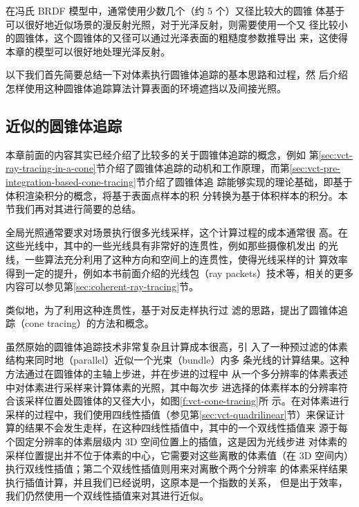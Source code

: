 在冯氏 BRDF 模型中，通常使用少数几个（约 5 个）又径比较大的圆锥 体基于可以很好地近似场景的漫反射光照，对于光泽反射，则需要使用一个又 径比较小的圆锥体，这个圆锥体的又径可以通过光泽表面的粗糙度参数推导出 来，这使得本章的模型可以很好地处理光泽反射。

以下我们首先简要总结一下对体素执行圆锥体追踪的基本思路和过程，然 后介绍怎样使用这种圆锥体追踪算法计算表面的环境遮挡以及间接光照。




\subsection{近似的圆锥体追踪}
本章前面的内容其实已经介绍了比较多的关于圆锥体追踪的概念，例如 第\ref{sec:vct-ray-tracing-in-a-cone}节介绍了圆锥体追踪的动机和工作原理，而第\ref{sec:vct-pre-integration-based-cone-tracing}节介绍了圆锥体追 踪能够实现的理论基础，即基于体积渲染积分的概念，将基于表面点样本的积 分转换为基于体积样本的积分。本节我们再对其进行简要的总结。

全局光照通常要求对场景执行很多光线采样，这个计算过程的成本通常很 高。在这些光线中，其中的一些光线具有非常好的连贯性，例如那些摄像机发出 的光线，一些算法充分利用了这种方向和空间上的连贯性，使得光线采样的计 算效率得到一定的提升，例如本书前面介绍的光线包（ray packets）技术\cite{a:InteractiveRenderingwithCoherentRayTracing}等，相关的更多内容可以参见第\ref{sec:coherent-ray-tracing}节。

类似地，为了利用这种连贯性，\cite{a:RayTracingwithCones}基于对反走样执行过 滤的思路，提出了圆锥体追踪（cone tracing）的方法和概念。

虽然原始的圆锥体追踪技术非常复杂且计算成本很高，\cite{a:Gigavoxels:Avoxelbasedrenderingpipelineforefficientexplorationoflargeanddetailedscenes}引 入了一种预过滤的体素结构来同时地（parallel）近似一个光束（bundle）内多 条光线的计算结果。这种方法通过在圆锥体的主轴上步进，并在步进的过程中 从一个多分辨率的体素表述中对体素进行采样来计算体素的光照，其中每次步 进选择的体素样本的分辨率符合该采样位置处圆锥体的又径大小，如图\ref{f:vct-cone-tracing}所 示。在对体素进行采样的过程中，我们使用四线性插值（参见第\ref{sec:vct-quadrilinear}节）来保证计算的结果不会发生走样，在这种四线性插值中，其中的一个双线性插值来 源于每个固定分辨率的体素层级内 3D 空间位置上的插值，这是因为光线步进 对体素的采样位置提出并不位于体素的中心，它需要对这些离散的体素值（在 3D 空间内）执行双线性插值；第二个双线性插值则用来对离散个两个分辨率 的体素采样结果执行插值计算，并且我们已经说明，这原本是一个指数的关系， 但是出于效率，我们仍然使用一个双线性插值来对其进行近似。

